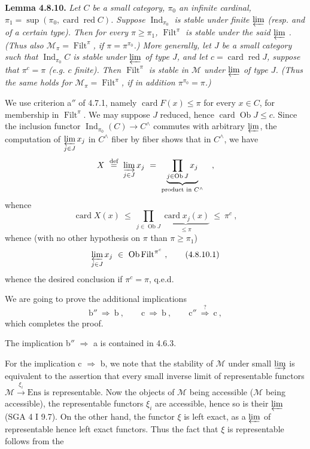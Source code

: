 \documentclass[11pt]{article}
\newcommand{\printedpage}[1]{\marginpar{\footnotesize p.~#1}}
\newcommand{\msp}[1]{\marginpar{\footnotesize [#1]}}
\newcommand{\Ind}{\operatorname{Ind}}
\newcommand{\Filt}{\operatorname{Filt}}
\newcommand{\card}{\operatorname{card}}
\newcommand{\red}{\operatorname{\text{red}}}
\newcommand{\Ob}{\operatorname{Ob}}
\newcommand{\Ens}{\mathrm{Ens}}
\newcommand{\cM}{\mathcal{M}}
\newcommand{\defeq}{\overset{\text{def}}{=}}
\begin{document}
\printedpage{74}

\textbf{Lemma 4.8.10.} \textit{Let $C$ be a small category, $\pi_0$ an infinite cardinal, $\pi_1 = \sup(\pi_0, \card\red C)$. Suppose $\Ind_{\pi_0}$ is stable under finite $\varprojlim$ (resp. and of a certain type). Then for every $\pi \geqslant \pi_1$, $\Filt^{\pi}$ is stable under the said $\varprojlim$ . (Thus also $\cM_{\pi} = \Filt^{\pi}$, if $\pi = \pi^{\pi_0}$.) More} %
\msp{page 209}
\textit{generally, let $J$ be a small category such that $\Ind_{\pi_0}C$ is stable under $\varprojlim$ of type $J$, and let $c = \card\red J$, suppose that $\pi^{c} = \pi$ (e.g. $c$ finite). Then $\Filt^{\pi}$ is stable in $\cM$ under $\varprojlim$ of type $J$. (Thus the same holds for $\cM_{\pi} = \Filt^{\pi}$, if in addition $\pi^{\pi_0} = \pi$.)}

We use criterion a$''$ of 4.7.1, namely $\card F(x) \leqslant \pi$ for every $x \in C$, for membership in $\Filt^{\pi}$. We may suppose $J$ reduced, hence $\card\Ob J \leqslant c$. Since the inclusion functor $\Ind_{\pi_0}(C) \longrightarrow C^{\wedge}$ commutes with arbitrary $\varprojlim$, the computation of $\varprojlim\limits_{j\in J} x_j$ in $C^{\wedge}$ fiber by fiber shows that in $C^{\wedge}$, we have
\[
X \ \defeq\ \varinjlim_{j\in J} x_j \ = \ \underbrace{\prod_{j\in\Ob J} x_j}_{\text{product in } C^{\wedge}} \quad ,
\] %
whence
\[
\card X(x) \ \leqslant\ \prod_{j\in\Ob J} \underbrace{\card x_j(x)}_{\leqslant\pi} \ \leqslant\ \pi^{c}\ ,
\]
whence (with no other hypothesis on $\pi$ than $\pi \geqslant \pi_1$)
\[
\varprojlim_{j\in J} x_j \ \in\ \Ob\Filt^{\pi^{c}}\ , \tag*{(4.8.10.1)}
\]
whence the desired conclusion if $\pi^{c} = \pi$, q.e.d.

\msp{page 210}

We are going to prove the additional implications
\[
\text{b}'' \ \Longrightarrow\ \text{b}\ , \qquad \text{c} \ \Longrightarrow\ \text{b}\ , \qquad \text{c}'' \ \overset{?}{\Longrightarrow}\ \text{c}\ ,
\]
which completes the proof.

The implication b$''$ $\Longrightarrow$ a is contained in 4.6.3.

For the implication c $\Longrightarrow$ b, we note that the stability of $\cM$ under small $\varinjlim$ is equivalent to the assertion that every small inverse limit of representable functors $\cM \xrightarrow{\ \xi_i\ } \Ens$ is representable. Now the objects of $\cM$ being accessible ($\cM$ being accessible), the representable functors $\xi_i$ are accessible, hence so is their $\varprojlim$ (SGA 4 I 9.7). On the other hand, the functor $\xi$ is left exact, as a $\varprojlim$ of representable hence left exact functors. Thus the fact that $\xi$ is representable follows from the %
\end{document}
